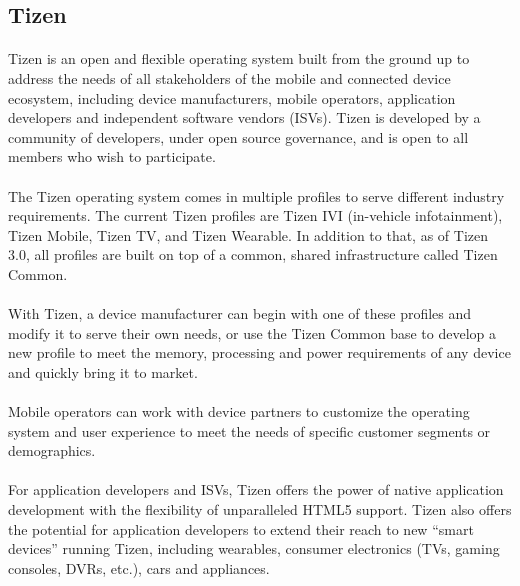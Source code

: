 \paragraph{}


\subsection{Tizen}


\paragraph{}
Tizen is an open and flexible operating system built from the ground up to address the needs of all stakeholders of the mobile and connected device ecosystem, including device manufacturers, mobile operators, application developers and independent software vendors (ISVs). Tizen is developed by a community of developers, under open source governance, and is open to all members who wish to participate.

\paragraph{}
The Tizen operating system comes in multiple profiles to serve different industry requirements. The current Tizen profiles are Tizen IVI (in-vehicle infotainment), Tizen Mobile, Tizen TV, and Tizen Wearable. In addition to that, as of Tizen 3.0, all profiles are built on top of a common, shared infrastructure called Tizen Common.

\paragraph{}
With Tizen, a device manufacturer can begin with one of these profiles and modify it to serve their own needs, or use the Tizen Common base to develop a new profile to meet the memory, processing and power requirements of any device and quickly bring it to market.

\paragraph{}
Mobile operators can work with device partners to customize the operating system and user experience to meet the needs of specific customer segments or demographics.

\paragraph{}
For application developers and ISVs, Tizen offers the power of native application development with the flexibility of unparalleled HTML5 support. Tizen also offers the potential for application developers to extend their reach to new “smart devices” running Tizen, including wearables, consumer electronics (TVs, gaming consoles, DVRs, etc.), cars and appliances.

